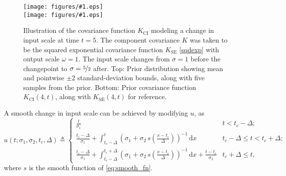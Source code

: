 \documentclass{article}
\newcommand{\deq}{\triangleq}
\newcommand{\psff}[1]{\texttt{[image: figures/\#1.eps]}}
\newcommand{\intd}[1]{\,\mathrm{d}#1}
\begin{document}
\begin{figure}
  \centering
  \psff{changepointcovsamples2} \\
  \bigskip
  \psff{changepointcov2}\medskip
  \caption{Illustration of the covariance function $K_{\text{CI}}$
    modeling a change in input scale at time $t = \text{5}$.  The
    component covariance $K$ was taken to be the squared exponential
    covariance function $K_{\text{SE}}$ \eqref{sqdexp} with output
    scale $\omega = 1$.  The input scale changes from $\sigma = 1$
    before the changepoint to $\sigma = \nicefrac{5}{2}$ after. Top:
    Prior distribution showing mean and pointwise $\pm 2$
    standard-deviation bounds, along with five samples from the prior.
    Bottom: Prior covariance function $K_{\text{CI}}(4, t)$, along
    with $K_{\text{SE}}(4, t)$ for reference.  }
  \label{fig:changeinput}
\end{figure}

A smooth change in input scale can be achieved by modifying $u$, as
$$
  u(t; \sigma_1, \sigma_2, t_c, \Delta) \deq
\begin{cases}
    \frac{t}{\sigma_1} 
& t < t_c - \Delta; \\
\frac{t_c- \Delta}{\sigma_1} + \int_{t_c - \Delta}^{t} (\sigma_1 +\sigma_2 \,s(\frac{x-t_c}{\Delta}))^{-1} \intd{x}
& t_c - \Delta \leq t < t_c + \Delta; \\
    \frac{t_c- \Delta}{\sigma_1} + \int_{t_c - \Delta}^{t_c + \Delta} (\sigma_1 +\sigma_2 \,s(\frac{x-t_c}{\Delta}))^{-1} \intd{x} +  \frac{t - t_c}{\sigma_2} 
& t_c + \Delta \leq t,
\end{cases}
$$
where $s$ is the smooth function of \eqref{eq:smooth_fn}. 

\end{document}
